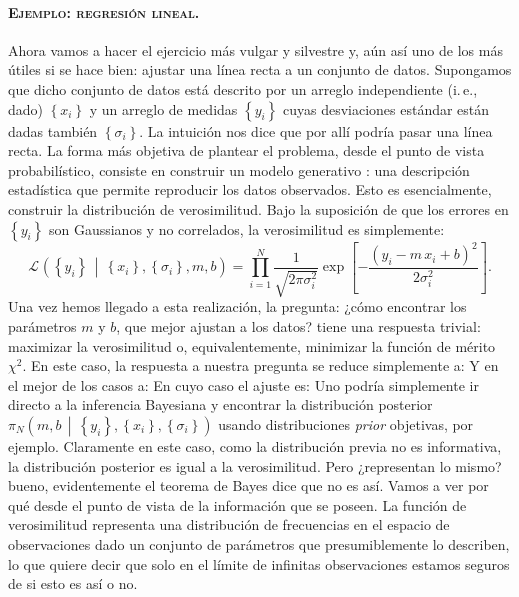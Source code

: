 \documentclass[a4paper,twoside]{article}
\newcommand{\pos}[2]{\ensuremath{\pi_N\left(#1\,\middle|\, #2\right)}\xspace}
\newcommand{\lik}[3][]{\ensuremath{\mathcal{L}_{#1}\left(#2\,\middle|\, #3\right)}\xspace}
\newcommand{\set}[1]{\ensuremath{\left\{#1\right\}}\xspace}
\begin{document}
\paragraph{\textsc{Ejemplo: regresión lineal.}} Ahora vamos a hacer el ejercicio más
vulgar y silvestre y, aún así uno de los más útiles si se hace bien: ajustar una línea recta a un
conjunto de datos. Supongamos que dicho conjunto de datos está descrito por un arreglo independiente
(i.\,e., dado) $\set{x_i}$ y un arreglo de medidas $\set{y_i}$ cuyas desviaciones estándar están
dadas también $\set{\sigma_i}$.
La intuición nos dice que por allí podría pasar una línea recta. La forma más objetiva de plantear
el problema, desde el punto de vista probabilístico, consiste en construir un modelo generativo
\citep{Hogg2010}: una descripción estadística que permite reproducir los datos observados. Esto es
esencialmente, construir la distribución de verosimilitud. Bajo la suposición de que los errores en
$\set{y_i}$ son Gaussianos y no correlados, la verosimilitud es simplemente:
%
$$\lik{\set{y_i}}{\set{x_i},\set{\sigma_i},m,b} = \prod_{i=1}^N\frac{1}{\sqrt{2\pi\sigma_i^2}}\exp{\left[-\frac{\left(y_i-m\,x_i+b\right)^2}{2\sigma_i^2}\right]}.$$
%
Una vez hemos llegado a esta realización, la pregunta: ¿cómo encontrar los parámetros $m$ y $b$, que
mejor ajustan a los datos? tiene una respuesta trivial: maximizar la verosimilitud o,
equivalentemente, minimizar la función de mérito $\chi^2$. En este caso, la respuesta a nuestra
pregunta se reduce simplemente a:
Y en el mejor de los casos a:
En cuyo caso el ajuste es:
Uno podría simplemente ir directo a la inferencia Bayesiana y encontrar la distribución posterior
$\pos{m,b}{\set{y_i},\set{x_i},\set{\sigma_i}}$ usando distribuciones \emph{prior} objetivas, por
ejemplo.
Claramente en este caso, como la distribución previa no es informativa, la distribución posterior es
igual a la verosimilitud. Pero ¿representan lo mismo? bueno, evidentemente el teorema de Bayes dice
que no es así. Vamos a ver por qué desde el punto de vista de la información que se poseen. La
función de verosimilitud representa una distribución de frecuencias en el espacio de observaciones
dado un conjunto de parámetros que presumiblemente lo describen, lo que quiere decir que solo en el
límite de infinitas observaciones estamos seguros de si esto es así o no.
\end{document}
